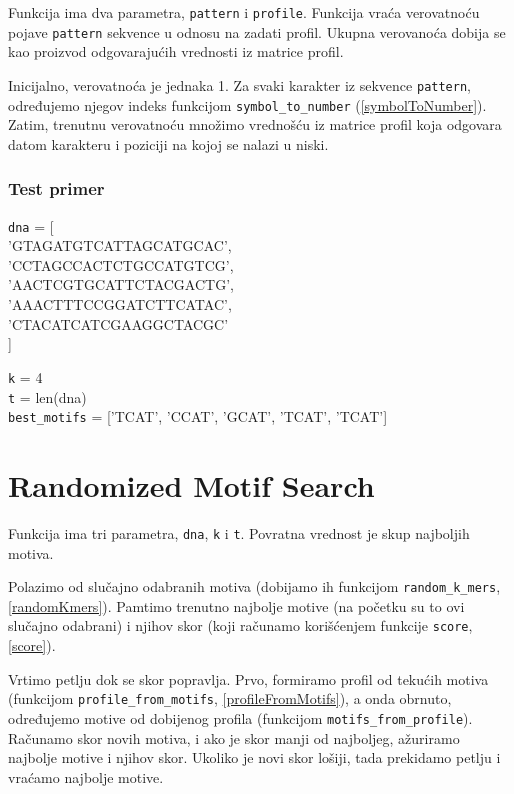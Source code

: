 Funkcija ima dva parametra, \texttt{pattern} i \texttt{profile}. Funkcija vraća verovatnoću pojave \texttt{pattern} sekvence u odnosu na zadati profil. Ukupna verovanoća dobija se kao proizvod odgovarajućih vrednosti iz matrice profil.

Inicijalno, verovatnoća je jednaka 1. Za svaki karakter iz sekvence \texttt{pattern}, određujemo njegov indeks funkcijom \texttt{symbol\_to\_number} (\ref{symbolToNumber}). Zatim, trenutnu verovatnoću množimo vrednošću iz matrice profil koja odgovara datom karakteru i poziciji na kojoj se nalazi u niski.




\subsubsection{Test primer}
\noindent\texttt{dna} = [ \\
\indent'GTAGATGTCATTAGCATGCAC', \\
\indent'CCTAGCCACTCTGCCATGTCG', \\
\indent'AACTCGTGCATTCTACGACTG', \\
\indent'AAACTTTCCGGATCTTCATAC', \\
\indent'CTACATCATCGAAGGCTACGC' \\
]

\noindent \texttt{k} = 4
\\\texttt{t} = len(dna)
\\\texttt{best\_motifs} = ['TCAT', 'CCAT', 'GCAT', 'TCAT', 'TCAT']



\section{Randomized Motif Search}

Funkcija ima tri parametra, \texttt{dna}, \texttt{k} i \texttt{t}. Povratna vrednost je skup najboljih motiva.

Polazimo od slučajno odabranih motiva (dobijamo ih funkcijom \texttt{random\_k\_mers}, \ref{randomKmers}). Pamtimo trenutno najbolje motive (na početku su to ovi slučajno odabrani) i njihov skor (koji računamo korišćenjem funkcije \texttt{score}, \ref{score}).

Vrtimo petlju dok se skor popravlja. Prvo, formiramo profil od tekućih motiva (funkcijom \texttt{profile\_from\_motifs}, \ref{profileFromMotifs}), a onda obrnuto, određujemo motive od dobijenog profila (funkcijom \texttt{motifs\_from\_profile}). Računamo skor novih motiva, i ako je skor manji od najboljeg, ažuriramo najbolje motive i njihov skor. Ukoliko je novi skor lošiji, tada prekidamo petlju i vraćamo najbolje motive.



